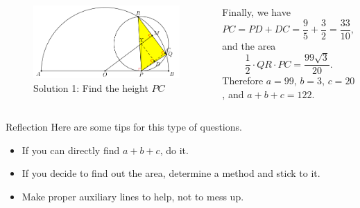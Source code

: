 \documentclass[professionalfont, 12pt, handout, t]{beamer} %
\theoremstyle{plain}
\theoremstyle{definition}
\begin{document}
\begin{frame}{}
    \begin{columns}    
        \begin{figure}[h]
            \centering
            \includegraphics[scale=0.3]{Geometry Solution 1.PNG}
            \captionsetup{labelformat=empty}
            \caption{Solution 1: Find the height $PC$}
        \end{figure}

        Finally, we have
        \[
            PC = PD+DC = \frac{9}{5}+\frac{3}{2} = \frac{33}{10},
        \]
        \pause
        and the area
        \[
            \frac{1}{2} \cdot QR \cdot PC = \frac{99\sqrt{3}}{20}.
        \]
        \pause
        Therefore $a = 99$, $b = 3$, $c = 20$, and $a+b+c = 122$.
    \end{columns}
\end{frame}

\begin{frame}{Reflection}
    Here are some tips for this type of questions.
    \begin{itemize}
        \item If you can directly find $a+b+c$, do it.

        \item If you decide to find out the area, determine a method and stick to it.

        \item Make proper auxiliary lines to help, not to mess up.
    \end{itemize}
\end{frame}
\end{document}
